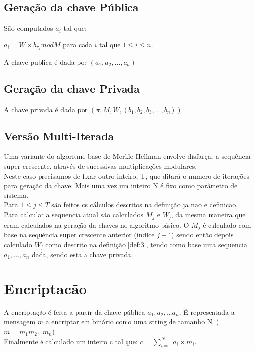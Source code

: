 \documentclass[11pt, language=portuguese]{report}
\begin{document}
\subsection{Geração da chave Pública}
\begin{definition}\label{def:4}
	São computados ${a_i}$ tal que:
	\begin{center}
		$a_i = W \times b_{\pi_i} mod M $ para cada $i$ tal que $1 \le i \le n$.
        \end{center}
\end{definition}
A chave publica é dada por $({a_1, a_2, ..., a_n})$

\subsection{Geração da chave Privada}
A chave privada é dada por $(\pi, M, W, {(b_1, b_2, b_3, ..., b_n)})$
\autocite{handbook}

\subsection{Versão Multi-Iterada}
Uma variante do algoritmo base de Merkle-Hellman envolve disfarçar a sequência super crescente, através de sucessivas multiplicações modulares.
\\
Neste caso precisamos de fixar outro inteiro, T, que ditará o numero de iterações para geração da chave.
Mais uma vez um inteiro N é fixo como parâmetro de sistema.
\\

Para $1 \le j \le T$ são feitos os cálculos descritos na definição ja nao e definicao. Para calcular a sequencia atual são calculados $M_j$ e $W_j$, da mesma maneira que eram calculados na geração da chaves no algoritmo básico. O $M_j$ é calculado com base na sequência super crescente anterior (índice $j-1$) sendo então depois calculado $W_j$ como descrito na definição \ref{def:3}, tendo como base uma sequencia ${a_1, ..., a_n}$ dada, sendo esta a chave privada.

\section{Encriptacão}
A encriptação é feita a partir da chave pública $a_1, a_2, ... a_n$. É representada a mensagem $m$ a encriptar em binário como uma string de tamanho N. ($m = m_1 m_2 ... m_n$)
\\
Finalmente é calculado um inteiro c tal que:
    $c = \sum_{i = 1}^{N} a_i \times m_i$.
\end{document}
